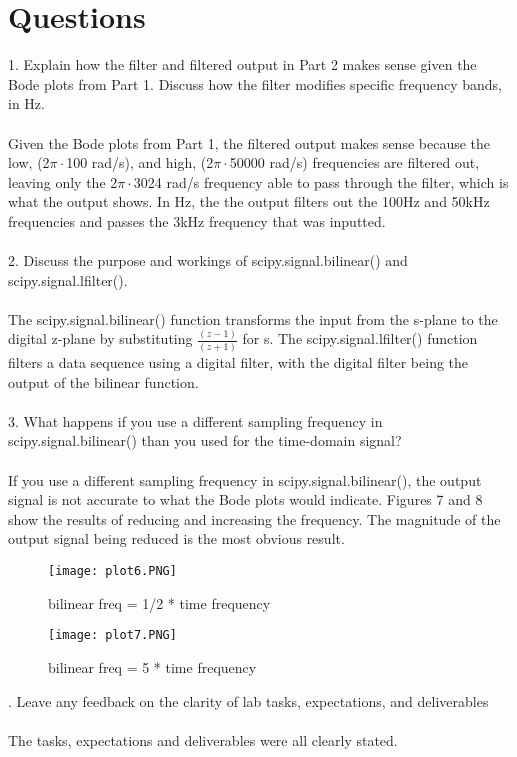 \newpage
\section{Questions}
1. Explain how the filter and filtered output in Part 2 makes sense given the Bode plots from Part 1. Discuss how the filter modifies specific frequency bands, in Hz.
\\ \\
Given the Bode plots from Part 1, the filtered output makes sense because the low, (2$\pi\cdot$100 rad/s), and high, (2$\pi\cdot$50000 rad/s) frequencies are filtered out, leaving only the 2$\pi\cdot$3024 rad/s frequency able to pass through the filter, which is what the output shows.  In Hz, the the output filters out the 100Hz and 50kHz frequencies and passes the 3kHz frequency that was inputted.
\\ \\
2. Discuss the purpose and workings of scipy.signal.bilinear() and scipy.signal.lfilter().
\\ \\
The scipy.signal.bilinear() function transforms the input from the s-plane to the digital z-plane by substituting $\frac{(z-1)}{(z+1)}$ for s.  The scipy.signal.lfilter() function filters a data sequence using a digital filter, with the digital filter being the output of the bilinear function.
\\ \\
3. What happens if you use a different sampling frequency in scipy.signal.bilinear() than you used for the time-domain signal?
\\ \\ 
If you use a different sampling frequency in scipy.signal.bilinear(), the output signal is not accurate to what the Bode plots would indicate.  Figures 7 and 8 show the results of reducing and increasing the frequency.  The magnitude of the output signal being reduced is the most obvious result.               
\begin{figure}[H]
    \centering
    \texttt{[image: plot6.PNG]}
   	\caption{bilinear freq = 1/2 * time frequency}
\end{figure} 

\begin{figure}[H]
    \centering
    \texttt{[image: plot7.PNG]}
   	\caption{bilinear freq = 5 * time frequency}
\end{figure} 
. Leave any feedback on the clarity of lab tasks, expectations, and deliverables
\\ \\ 
The tasks, expectations and deliverables were all clearly stated.



